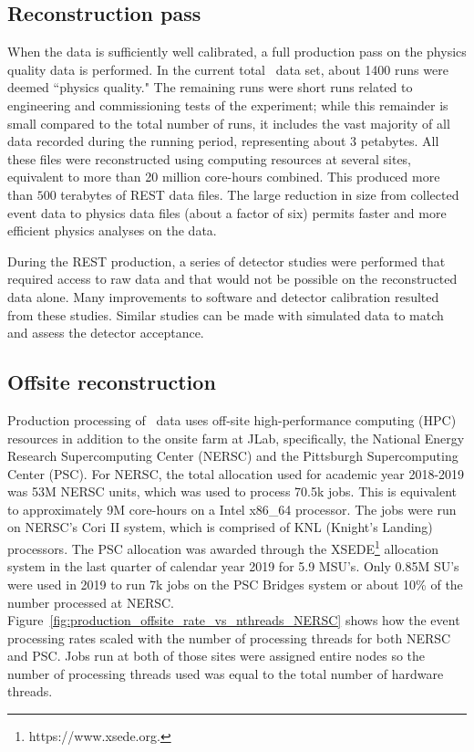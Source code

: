 \subsection{Reconstruction pass \label{sec:recreconstruction}}

When the data is sufficiently well calibrated, a full production pass on the physics quality data is performed. In the current total \GX~data set, about 1400 runs were deemed ``physics quality." The remaining runs were short runs related to engineering and commissioning tests of the experiment; while this remainder is small compared to the total number of runs, it includes the vast majority of all data recorded during the running period, representing about 3 petabytes. All these files were reconstructed using computing resources at several sites, equivalent to more than 20 million core-hours combined. This produced more than $500$ terabytes of REST data files. The large reduction in size from collected event data to physics data files (about a factor of six) permits faster and more efficient physics analyses on the data.

During the REST production, a series of detector studies were performed that required access to raw data and that would not be possible on the reconstructed data alone. Many improvements to software and detector calibration resulted from these studies. Similar studies can be made with simulated data to match and assess the detector acceptance.

\subsection{Offsite reconstruction}
\label{sec:recoffsite}

Production processing of \GX~data uses off-site high-performance computing (HPC) resources in addition to the onsite farm at JLab, specifically, the National Energy Research Supercomputing Center (NERSC) and the Pittsburgh Supercomputing Center (PSC). For NERSC, the total allocation used for academic year 2018-2019 was 53M NERSC units, which was used to process 70.5k jobs. This is equivalent to approximately 9M core-hours on a Intel x86\_64 processor. The jobs were run on NERSC's Cori II system, which is comprised of KNL (Knight's Landing) processors. The PSC allocation was awarded through the XSEDE\footnote{https://www.xsede.org.} allocation system in the last quarter of calendar year 2019 for 5.9 MSU's. Only 0.85M SU's were used in 2019 to run 7k jobs on the PSC Bridges system or about 10\% of the number processed at NERSC. Figure~\ref{fig:production_offsite_rate_vs_nthreads_NERSC} shows how the event processing rates scaled with the number of processing threads for both NERSC and PSC. Jobs run at both of those sites were assigned entire nodes so the number of processing threads used was equal to the total number of hardware threads.


